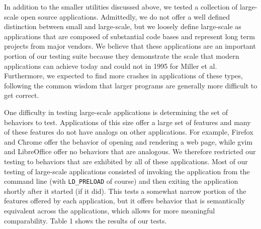 In addition to the smaller utilities discussed above, we tested a collection of large-scale open source applications. Admittedly, we do not offer a well defined distinction between small and large-scale, but we loosely define large-scale as applications that are composed of substantial code bases and represent long term projects from major vendors. We believe that these applications are an important portion of our testing suite because they demonstrate the scale that modern applications can achieve today and could not in 1995 for Miller et al. Furthermore, we expected to find more crashes in applications of these types, following the common wisdom that larger programs are generally more difficult to get correct.


One difficulty in testing large-scale applications is determining the set of behaviors to test. Applications of this size offer a large set of features and many of these features do not have analogs on other applications. For example, Firefox and Chrome offer the behavior of opening and rendering a web page, while gvim and LibreOffice offer no behaviors that are analogous. We therefore restricted our testing to behaviors that are exhibited by all of these applications. Most of our testing of large-scale applications consisted of invoking the application from the command line (with \texttt{LD\_PRELOAD} of course) and then exiting the application shortly after it started (if it did). This tests a somewhat narrow portion of the features offered by each application, but it offers behavior that is semantically equivalent across the applications, which allows for more meaningful comparability. Table 1 shows the results of our tests.

